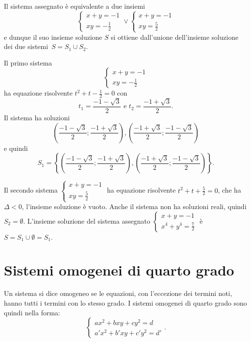 \begin{exrig}
\begin{esempio}
Il sistema assegnato è equivalente a due insiemi 
\[\left\{\begin{array}{l}{x+y=-1}\\{{xy}=-\frac 1 2}\end{array}\right.\vee \left\{\begin{array}{l}{x+y=-1}\\{{xy}=\frac 5 2}\end{array}\right.\] 
e dunque il suo insieme soluzione $S$ si ottiene dall'unione dell'insieme soluzione dei due 
sistemi~$S=S_1\cup S_2$.

Il primo sistema 
\[\left\{\begin{array}{l}{x+y=-1}\\{{xy}=-\frac 1 2}\end{array}\right.\] 
ha equazione risolvente $t^2+t-\frac 1 2=0$ con 
\[t_1=\frac{-1-\sqrt 3} 2\text{ e }t_2=\frac{-1+\sqrt 3} 2.\] 
Il sistema ha soluzioni 
\[\left(\frac{-1-\sqrt 3} 2;\frac{-1+\sqrt 3} 2\right),\left(\frac{-1+\sqrt 3} 2;\frac{-1-\sqrt 3} 2\right)\] e quindi \[S_1=\left\{\left(\frac{-1-\sqrt 3} 2;\frac{-1+\sqrt 3} 2\right),\left(\frac{-1+\sqrt 3} 2;\frac{-1-\sqrt 3} 2\right)\right\}.\]

Il secondo sistema $\left\{\begin{array}{l}{x+y=-1}\\{{xy}=\frac 5 2}\end{array}\right.$ ha equazione risolvente $t^2+t+\frac 5 2=0$, che ha $\Delta <0$, l'insieme soluzione è vuoto. Anche il sistema non ha soluzioni reali, quindi $S_2=\emptyset $. L'insieme soluzione del sistema assegnato $\left\{\begin{array}{l}{x+y=-1}\\{x^4+y^4=\frac 7 2}\end{array}\right.$ è $S=S_1\cup \emptyset =S_1$.
\end{esempio}
\end{exrig}
\ovalbox{\risolvii \ref{ese:6.26}, \ref{ese:6.27}, \ref{ese:6.28}, \ref{ese:6.29}, \ref{ese:6.30}, \ref{ese:6.31}, \ref{ese:6.32}, \ref{ese:6.33}, \ref{ese:6.34}, \ref{ese:6.35}}

\section{Sistemi omogenei di quarto grado}
Un sistema si dice omogeneo se le equazioni, con l'eccezione dei termini noti, hanno tutti i termini con lo stesso grado. I sistemi omogenei di quarto grado sono quindi nella forma:
\begin{equation*}
\left\{\begin{array}{l}{{ax}^2+{bxy}+{cy}^2=d}\\{a'x^2+b'{xy}+c'y^2=d'}\end{array}\right..
\end{equation*}
